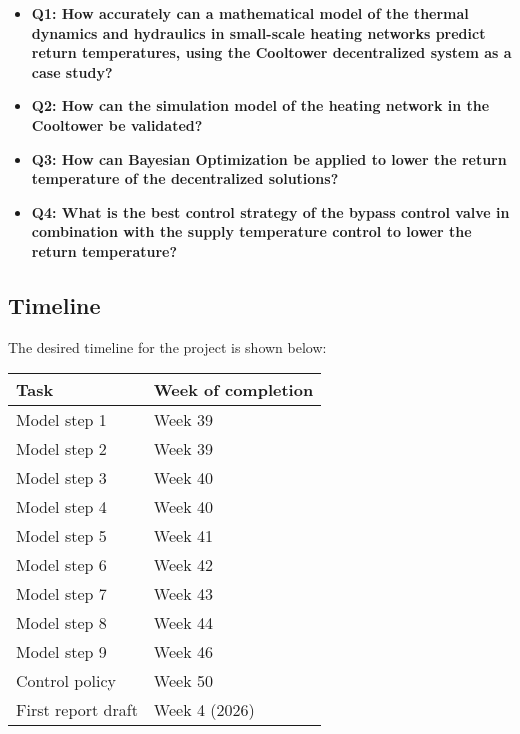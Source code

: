 \begin{itemize}
  \renewcommand\labelitemi{} %
    \item \textbf{Q1: How accurately can a mathematical model of the thermal dynamics and hydraulics in small-scale heating networks predict return temperatures, using the Cooltower decentralized system as a case study?}
    \item \textbf{Q2: How can the simulation model of the heating network in the Cooltower be validated?}
    \item \textbf{Q3: How can Bayesian Optimization be applied to lower the return temperature of the decentralized solutions?}
    \item \textbf{Q4: What is the best control strategy of the bypass control valve in combination with the supply temperature control to lower the return temperature?}  
    
\end{itemize}



\subsection{Timeline}
The desired timeline for the project is shown below:

\begin{table}[h]
\center
\begin{tabular}{l|l}
Task           & Week of completion \\ \hline
Model step 1   & Week 39\footnotemark[1]           \\
Model step 2   & Week 39\footnotemark[1]            \\
Model step 3   & Week 40            \\
Model step 4   & Week 40            \\
Model step 5   & Week 41            \\
Model step 6   & Week 42            \\
Model step 7   & Week 43            \\
Model step 8   & Week 44            \\
Model step 9   & Week 46            \\
Control policy & Week 50           \\
First report draft & Week 4 (2026)
\end{tabular}
\end{table}
